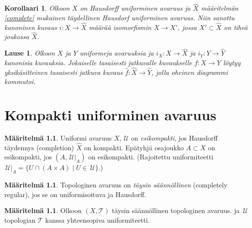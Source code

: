 \documentclass[12pt,a4paper,leqno]{report}
\newcommand{\U}{\,\mathcal{U}}
\newcommand{\T}{\mathcal{T}}
\theoremstyle{plain}
\newtheorem{lause}[equation]{Lause}
\newtheorem{kor}[equation]{Korollaari}
\theoremstyle{definition}
\newtheorem{maar}[equation]{Määritelmä}
\theoremstyle{remark}
\begin{document}
\begin{kor}
Olkoon $X$ on Hausdorff uniforminen avaruus ja $\hat X$ määritelmän \ref{complete} mukainen täydellinen Hausdorf uniforminen avaruus. 
Niin sanottu kanoninen kuvaus $i\colon X\rightarrow\hat X$ määrää 
isomorfismin $X\rightarrow X'$, jossa $X'\subset \hat X$ on tiheä joukossa $\hat X$.
\end{kor}
\begin{lause}
Olkoon $X$ ja $Y$ uniformeja avaruuksia ja $i_X\colon X\rightarrow\hat{X}$ ja $i_Y\colon Y\rightarrow\hat{Y}$ kanonisia kuvauksia. 
Jokaiselle tasaisesti jatkuvalle kuvaukselle $f\colon X\rightarrow Y$ 
löytyy yksikäsitteinen tasaisesti jatkuva kuvaus $\hat{f}\colon \hat{X}\rightarrow \hat{Y}$, jolla oheinen diagrammi kommutoi. 
\end{lause}
\chapter{Kompakti uniforminen avaruus}
\begin{maar}
Uniformi avaruus $X,\U$ on \emph{esikompakti}, 
jos Hausdorff täydennys (completion) $\hat{X}$ on kompakti. 
Epätyhjä osajoukko $A\subset X$ on esikompakti, jos $(A,\U\vert _A)$ on esikompakti. 
(Rajoitettu uniformiteetti $\U\vert _A=\{U\cap (A\times A)\mid U\in\U\}$.)
\end{maar}

\begin{maar}
Topologinen avaruus on \emph{täysin säännöllinen} (completely regular), 
jos se on uniformisoituva ja Hausdorff.
\end{maar}

\begin{maar}
Olkoon $(X,\T)$ täysin säännöllinen topologinen avaruus. 
ja $\U$ topologian $\T$ kanssa yhteensopiva uniformiteetti. 

\end{maar}
\end{document}
